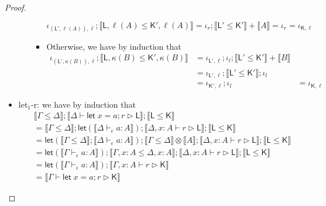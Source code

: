\documentclass[acmsmall,screen,review]{acmart}
\newcommand{\ms}[1]{\ensuremath{\mathsf{#1}}}
\newcommand{\letstmt}[3]{\ensuremath{\ms{let}\;#1 = #2; #3}}
\newcommand{\bhyp}[2]{#1 : #2}
\newcommand{\hasty}[4]{#1 \vdash_{#2} #3: {#4}}
\newcommand{\haslb}[3]{#1 \vdash #2 \rhd #3}
\newcommand{\brle}[1]{{\textsf{#1}}}
\newcommand{\dnt}[1]{\llbracket{#1}\rrbracket}
\newcommand{\lmor}[1]{\ms{let}(#1)}
\begin{document}
\begin{proof}
\begin{itemize}
\begin{itemize}
\begin{itemize}
        \begin{equation}
          \iota_{(\ms{L}', \ell(A)), \ell} 
          ; \dnt{\ms{L}, \ell(A) \leq \ms{K}', \ell(A)}
          = \iota_r ; \dnt{\ms{L}' \leq \ms{K}'} + \dnt{A}
          = \iota_r
           = \iota_{\ms{K}, \ell}
        \end{equation}
        \item Otherwise, we have by induction that
        \begin{equation}
          \begin{aligned}
          \iota_{(\ms{L}', \kappa(B)), \ell}
          ; \dnt{\ms{L}, \kappa(B) \leq \ms{K}', \kappa(B)}
          & = \iota_{\ms{L}', \ell} ; \iota_l ; \dnt{\ms{L}' \leq \ms{K}'} + \dnt{B} \\
          & = \iota_{\ms{L}', \ell} ; \dnt{\ms{L}' \leq \ms{K}'} ; \iota_l \\
          & = \iota_{\ms{K}', \ell} ; \iota_l & = \iota_{\ms{K}, \ell}
          \end{aligned}
        \end{equation}
      \end{itemize}
    \end{itemize}
    \item \brle{let$_1$-r}: we have by induction that
    \begin{equation}
      \begin{aligned}
        & \dnt{\Gamma \leq \Delta} 
          ; \dnt{\haslb{\Delta}{\letstmt{x}{a}{r}}{\ms{L}}} 
          ; \dnt{\ms{L} \leq \ms{K}} \\
        & = \dnt{\Gamma \leq \Delta}
          ; \lmor{\dnt{\hasty{\Delta}{\epsilon}{a}{A}}}
          ; \dnt{\haslb{\Delta, \bhyp{x}{A}}{r}{\ms{L}}}
          ; \dnt{\ms{L} \leq \ms{K}} \\
        & = \lmor{\dnt{\Gamma \leq \Delta} ; \dnt{\hasty{\Delta}{\epsilon}{a}{A}}}
          ; \dnt{\Gamma \leq \Delta} \otimes \dnt{A}
          ; \dnt{\haslb{\Delta, \bhyp{x}{A}}{r}{\ms{L}}}
          ; \dnt{\ms{L} \leq \ms{K}} \\
        & = \lmor{\dnt{\hasty{\Gamma}{\epsilon}{a}{A}}}
          ; \dnt{\Gamma, \bhyp{x}{A} \leq \Delta, \bhyp{x}{A}}
          ; \dnt{\haslb{\Delta, \bhyp{x}{A}}{r}{\ms{L}}}
          ; \dnt{\ms{L} \leq \ms{K}} \\
        & = \lmor{\dnt{\hasty{\Gamma}{\epsilon}{a}{A}}}
          ; \dnt{\haslb{\Gamma, \bhyp{x}{A}}{r}{\ms{K}}} \\
        & = \dnt{\haslb{\Gamma}{\letstmt{x}{a}{r}}{\ms{K}}}
      \end{aligned}

\end{equation}
\end{itemize}
\end{proof}
\end{document}

